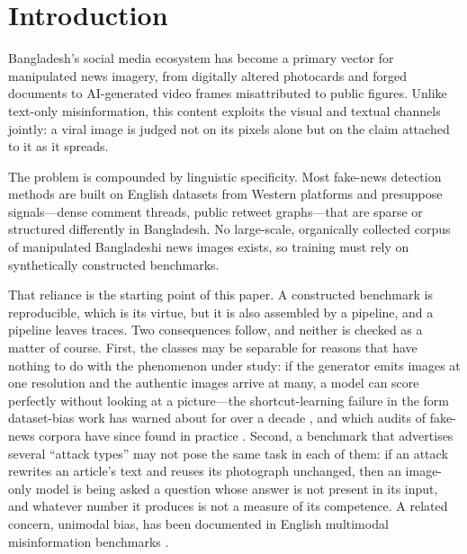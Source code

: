 %
%

\section{Introduction}

Bangladesh's social media ecosystem has become a primary vector for manipulated
news imagery, from digitally altered photocards and forged documents to
AI-generated video frames misattributed to public figures. Unlike text-only
misinformation, this content exploits the visual and textual channels jointly:
a viral image is judged not on its pixels alone but on the claim attached to it
as it spreads.

The problem is compounded by linguistic specificity. Most fake-news detection
methods are built on English datasets from Western platforms and presuppose
signals---dense comment threads, public retweet graphs---that are sparse or
structured differently in Bangladesh. No large-scale, organically collected
corpus of manipulated Bangladeshi news images exists, so training must rely on
synthetically constructed benchmarks.

That reliance is the starting point of this paper. A constructed benchmark is
reproducible, which is its virtue, but it is also assembled by a pipeline, and
a pipeline leaves traces. Two consequences follow, and neither is checked as a
matter of course. First, the classes may be separable for reasons that have
nothing to do with the phenomenon under study: if the generator emits images at
one resolution and the authentic images arrive at many, a model can score
perfectly without looking at a picture---the shortcut-learning failure
\cite{shortcut} in the form dataset-bias work has warned about for over a
decade \cite{datasetbias}, and which audits of fake-news corpora have since
found in practice \cite{verma}. Second, a benchmark that advertises several
``attack types'' may not pose the same task in each of them: if an attack
rewrites an article's text and reuses its photograph unchanged, then an
image-only model is being asked a question whose answer is not present in its
input, and whatever number it produces is not a measure of its competence. A
related concern, unimodal bias, has been documented in English multimodal
misinformation benchmarks \cite{verite}.


